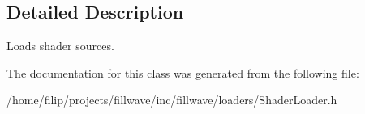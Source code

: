 \subsection{Detailed Description}
Loads shader sources. 

The documentation for this class was generated from the following file\+:\begin{DoxyCompactItemize}
\item 
/home/filip/projects/fillwave/inc/fillwave/loaders/Shader\+Loader.\+h\end{DoxyCompactItemize}
